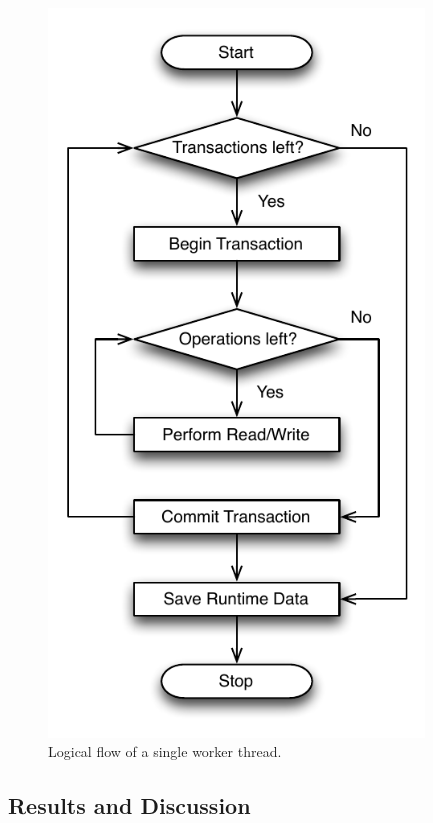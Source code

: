 \begin{figure}[h!]
\begin{minipage}[c]{0.45\linewidth}
    \includegraphics[width=0.89\textwidth]{figures/bench/worker}
    \caption{Logical flow of a single worker thread.}
    \label{fig:eval-worker}
\end{minipage}
\end{figure}

\subsection{Results and Discussion}

